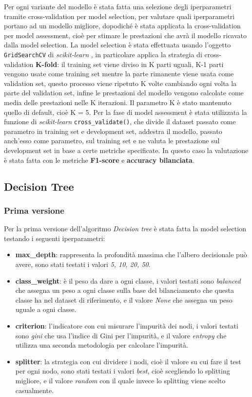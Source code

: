 Per ogni variante del modello è stata fatta una selezione degli iperparametri tramite cross-validation per model selection, per valutare quali iperparametri portano ad un modello migliore, dopodiché è stata applicata la cross-validation per model assessment, cioè per stimare le prestazioni che avrà il modello ricavato dalla model selection. La model selection è stata effettuata usando l'oggetto \verb+GridSearchCV+ di \textit{scikit-learn} \cite{sklearn}, in particolare applica la strategia di cross-validation \textbf{K-fold}: il training set viene diviso in K parti uguali, K-1 parti vengono usate come training set mentre la parte rimanente viene usata come validation set, questo processo viene ripetuto K volte cambiando ogni volta la parte del validation set, infine le prestazioni del modello vengono calcolate come media delle prestazioni nelle K iterazioni. Il parametro K è stato mantenuto quello di default, cioè K = 5. Per la fase di model assessment è stata utilizzata la funzione di \textit{scikit-learn} \cite{sklearn} \verb+cross_validate()+, che divide il dataset passato come parametro in training set e development set, addestra il modello, passato anch'esso come parametro, sul training set e ne valuta le prestazione sul development set in base a certe metriche specificate. In questo caso la valutazione è stata fatta con le metriche \textbf{F1-score} e \textbf{accuracy bilanciata}.

\subsection{Decision Tree}
\subsubsection{Prima versione}\label{subsubsec:dtv1}
Per la prima versione dell'algoritmo \textit{Decision tree} è stata fatta la model selection testando i seguenti iperparametri:
\begin{itemize}
\item \textbf{max\_depth}: rappresenta la profondità massima che l'albero decisionale può avere, sono stati testati i valori \textit{5, 10, 20, 50}.
\item \textbf{class\_weight}: è il peso da dare a ogni classe, i valori testati sono \textit{balanced} che assegna un peso a ogni classe sulla base del bilanciamento che questa classe ha nel dataset di riferimento, e il valore \textit{None} che assegna un peso uguale a ogni classe.
\item \textbf{criterion}: l'indicatore con cui misurare l'impurità dei nodi, i valori testati sono \textit{gini} che usa l'indice di Gini per l'impurità, e il valore \textit{entropy} che utilizza una seconda metodologia per calcolare l'impurità.
\item \textbf{splitter}: la strategia con cui dividere i nodi, cioè il valore su cui fare il test per ogni nodo, sono stati testati i valori \textit{best}, cioè scegliendo lo splitting migliore, e il valore \textit{random} con il quale invece lo splitting viene scelto casualmente.
\end{itemize}

